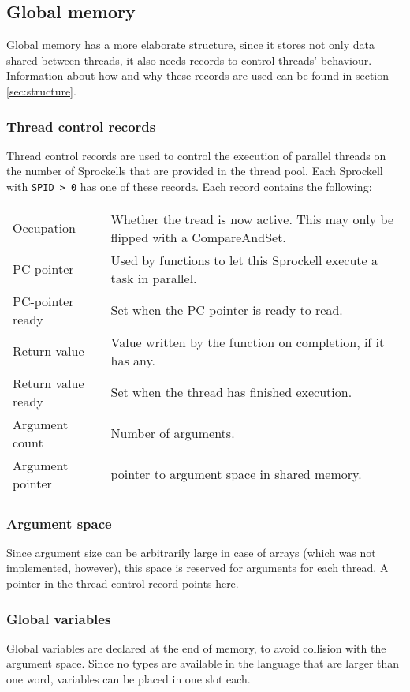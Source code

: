 \documentclass[10pt,a4paper]{report}
\begin{document}
\subsection{Global memory}
Global memory has a more elaborate structure, since it stores not only data shared between threads, it also needs records to control threads' behaviour. Information about how and why these records are used can be found in section \ref{sec:structure}. 

\subsubsection{Thread control records}
Thread control records are used to control the execution of parallel threads on the number of Sprockells that are provided in the thread pool. Each Sprockell with \texttt{SPID > 0} has one of these records. Each record contains the following:

\begin{tabular}{| l || l |}
\hline
Occupation & Whether the tread is now active. This may only be flipped with a CompareAndSet. \\
PC-pointer & Used by functions to let this Sprockell execute a task in parallel. \\
PC-pointer ready & Set when the PC-pointer is ready to read. \\
Return value & Value written by the function on completion, if it has any. \\
Return value ready & Set when the thread has finished execution. \\
Argument count & Number of arguments. \\
Argument pointer & pointer to argument space in shared memory. \\ 
\hline
\end{tabular}

\subsubsection{Argument space}
Since argument size can be arbitrarily large in case of arrays (which was not implemented, however), this space is reserved for arguments for each thread. A pointer in the thread control record points here.
       
\subsubsection{Global variables}
Global variables are declared at the end of memory, to avoid collision with the argument space. Since no types are available in the language that are larger than one word, variables can be placed in one slot each.
\end{document}
